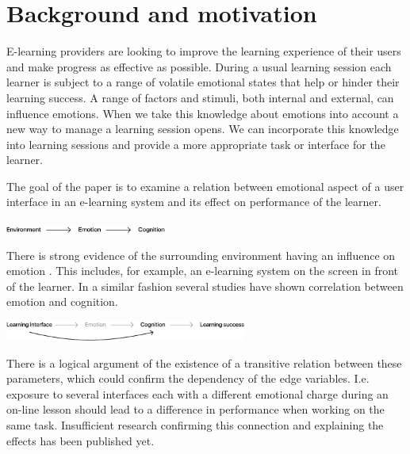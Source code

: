 

\pagebreak

\section{Background and motivation}

E-learning providers are looking to improve the learning experience of their users and make progress as effective as possible. 
During a usual learning session each learner is subject to a range of volatile emotional states that help or hinder their learning success. 
A range of factors and stimuli, both internal and external, can influence emotions. 
When we take this knowledge about emotions into account a new way to manage a learning session opens. We can incorporate this knowledge into learning sessions and provide a more appropriate task or interface for the learner.

The goal of the paper is to examine a relation between emotional aspect of a user interface in an e-learning system and its effect on performance of the learner.


\begin{center}
	\includegraphics[width=200px]{images/relation1.png}
\end{center}
 
There is strong evidence of the surrounding environment having an influence on emotion \cite{Johnson2000, Arockiam2013, Bertamini2013}. This includes, for example, an e-learning system on the screen in front of the learner. In a similar fashion several studies have shown correlation between emotion and cognition.

\begin{center}
\includegraphics[width=300px]{images/relation2.png}
\end{center}

There is a logical argument of the existence of a transitive relation between these parameters, which could confirm the dependency of the edge variables. 
I.e. exposure to several interfaces each with a different emotional charge during an on-line lesson should lead to a difference in performance when working on the same task.
Insufficient research confirming this connection and explaining the effects has been published yet. 

